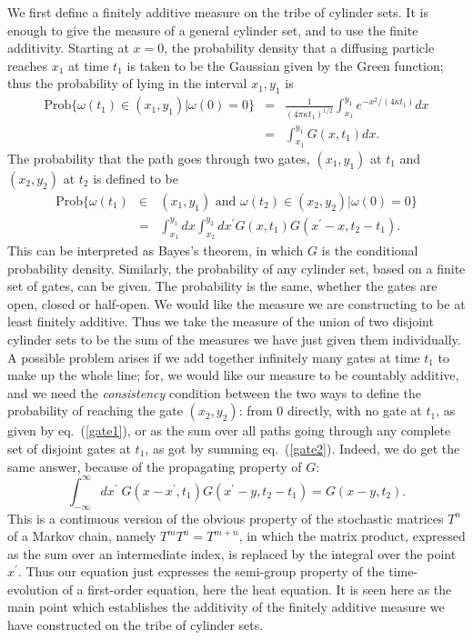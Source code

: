 We first define a finitely additive measure on the tribe of cylinder sets.
It is enough
to give the measure of a general cylinder set, and to use the finite
additivity. Starting at $x=0$, the probability density
that a diffusing particle reaches $x_1$ at time $t_1$ is taken to be the
Gaussian given by the Green function; thus the probability of lying in the
interval $x_1,y_1$ is
\begin{eqnarray}
\mbox{Prob}\{\omega(t_1)\in(x_1,y_1)|\omega(0)=0\}&=&\frac{1}{(4\pi\kappa t_1)
^{1/2}}\int_{x_1}^{y_1}e^{-x^2/(4\kappa t_1)}dx\nonumber\\
&=&\int_{x_1}^{y_1}G(x,t_1)dx.
\label{gate1}
\end{eqnarray}
The probability that the path goes through two gates, $(x_1,y_1)$ at $t_1$
and $(x_2,y_2)$ at $t_2$ is defined to be
\begin{eqnarray}
\mbox{Prob}\{\omega(t_1)&\in&(x_1,y_1)\mbox{ and }\omega(t_2)\in(x_2,y_2)|
\omega(0)=0\}\nonumber\\
&=&\int_{x_1}^{y_1}dx\int_{x_2}^{y_2}dx^\prime G(x,t_1)G(x^
\prime-x,t_2-t_1).
\label{gate2}
\end{eqnarray}
This can be interpreted as Bayes's theorem, in which $G$
is the conditional probability density.
Similarly, the probability of any cylinder set, based on a finite set of
gates, can be given. The probability is the same, whether the gates are
open, closed or half-open. We would like the measure we are constructing
to be at least finitely additive. Thus we take the measure of the union
of two disjoint cylinder sets to be the sum of the measures we have
just given them individually. A possible problem arises if we add together
infinitely many gates at time $t_1$ to make up the whole line; for, we
would like our measure to be countably additive, and we need the {\em
consistency} condition between the two ways to define the probability
of reaching the gate $(x_2,y_2)$: from $0$ directly, with no gate at $t_1$,
as given by eq.~(\ref{gate1}), 
or as the sum over all paths going through any complete set of disjoint
gates at $t_1$, as got by summing eq.~(\ref{gate2}). Indeed, we do
get the same answer, because of the propagating property of $G$:
\begin{equation}
\int_{-\infty}^{\infty}dx^\prime\;G(x-x^\prime,t_1)G(x^\prime-y,t_2-t_1)=
G(x-y,t_2).
\end{equation}
This is a continuous version of the obvious property of the stochastic
matrices $T^n$ of a Markov chain, namely $T^mT^n=T^{m+n}$, in which the
matrix product, expressed as the sum over an intermediate index, is
replaced by the integral over the point $x^\prime$. Thus our equation
just expresses the semi-group property of the time-evolution of a
first-order equation, here the heat equation.
It is seen here as the main point which establishes the additivity
of the finitely additive measure we have constructed on the tribe of
cylinder sets.


